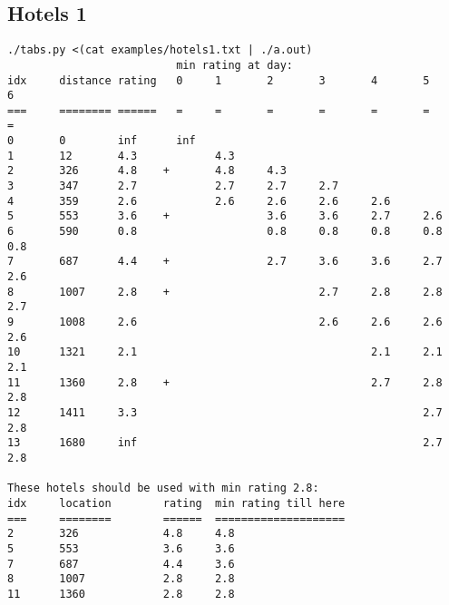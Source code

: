 \documentclass[a4paper,10pt,ngerman]{scrartcl}
\begin{document}
\subsection*{Hotels 1}
\begin{lstlisting}
./tabs.py <(cat examples/hotels1.txt | ./a.out)
                          min rating at day:
idx     distance rating   0     1       2       3       4       5       6
===     ======== ======   =     =       =       =       =       =       =
0       0        inf      inf
1       12       4.3            4.3
2       326      4.8    +       4.8     4.3
3       347      2.7            2.7     2.7     2.7
4       359      2.6            2.6     2.6     2.6     2.6
5       553      3.6    +               3.6     3.6     2.7     2.6
6       590      0.8                    0.8     0.8     0.8     0.8     0.8
7       687      4.4    +               2.7     3.6     3.6     2.7     2.6
8       1007     2.8    +                       2.7     2.8     2.8     2.7
9       1008     2.6                            2.6     2.6     2.6     2.6
10      1321     2.1                                    2.1     2.1     2.1
11      1360     2.8    +                               2.7     2.8     2.8
12      1411     3.3                                            2.7     2.8
13      1680     inf                                            2.7     2.8

These hotels should be used with min rating 2.8:
idx     location        rating  min rating till here
===     ========        ======  ====================
2       326             4.8     4.8
5       553             3.6     3.6
7       687             4.4     3.6
8       1007            2.8     2.8
11      1360            2.8     2.8
\end{lstlisting}
\end{document}
